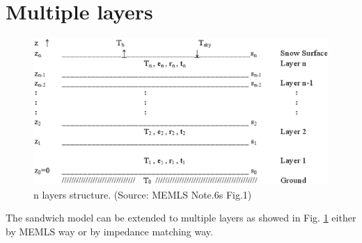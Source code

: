 \section{Multiple layers}
\label{sec:mult}
\begin{figure}[hbp]
  \centering
   \includegraphics[scale=0.5]{multilayers.eps} 
  \caption{n layers structure. (Source: MEMLS Note.6s Fig.1)}
  \label{fig:mul}
\end{figure}
The sandwich model can be extended to multiple layers as showed in Fig. \ref{fig:mul} either by MEMLS way or by impedance matching way. 
